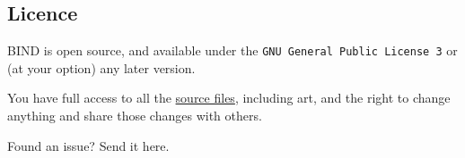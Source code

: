 \begin{multicols}{2}
\subsection*{Licence}

BIND is open source, and available under the {\tt GNU General Public License 3} or (at your option) any later version.

You have full access to all the \href{https://gitlab.com/bindrpg/core}{source files}, including art, and the right to change anything and share those changes with others.

\begin{center}
  
  Found an issue?
  Send it here.
\end{center}

\end{multicols}
